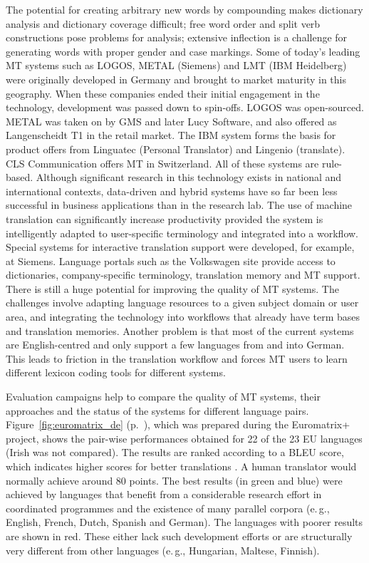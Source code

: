 \documentclass[]{../../metanetpaper}
\begin{document}
\begin{multicols}{2}
The potential for creating arbitrary new words by compounding makes dictionary analysis and dictionary coverage difficult; free word order and split verb constructions pose problems for analysis; extensive inflection is a challenge for generating words with proper gender and case markings. Some of today's leading MT systems such as LOGOS, METAL (Siemens) and LMT (IBM Heidelberg) were originally developed in Germany and brought to market maturity in this geography. When these companies ended their initial engagement in the technology, development was passed down to spin-offs. LOGOS was open-sourced. METAL was taken on by GMS and later Lucy Software, and also offered as Langenscheidt T1 in the retail market. The IBM system forms the basis for product offers from Linguatec (Personal Translator) and Lingenio (translate). CLS Communication offers MT in Switzerland. All of these systems are rule-based. Although significant research in this technology exists in national and international contexts, data-driven and hybrid systems have so far been less successful in business applications than in the research lab. The use of machine translation can significantly increase productivity provided the system is intelligently adapted to user-specific terminology and integrated into a workflow. Special systems for interactive translation support were developed, for example, at Siemens. Language portals such as the Volkswagen site provide access to dictionaries, company-specific terminology, translation memory and MT support. There is still a huge potential for improving the quality of MT systems. The challenges involve adapting language resources to a given subject domain or user area, and integrating the technology into workflows that already have term bases and translation memories. Another problem is that most of the current systems are English-centred and only support a few languages from and into German. This leads to friction in the translation workflow and forces MT users to learn different lexicon coding tools for different systems.

Evaluation campaigns help to compare the quality of MT systems, their approaches and the status of the systems for different language pairs. Figure~\ref{fig:euromatrix_de} (p.~\pageref{fig:euromatrix_de}), which was prepared during the Euromatrix+ project, shows the pair-wise performances obtained for 22 of the 23 EU languages (Irish was not compared). The results are ranked according to a BLEU score, which indicates higher scores for better translations \cite{bleu1}. A human translator would normally achieve around 80 points. The best results (in green and blue) were achieved by languages that benefit from a considerable research effort in coordinated programmes and the existence of many parallel corpora (e.\,g., English, French, Dutch, Spanish and German). The languages with poorer results are shown in red. These either lack such development efforts or are structurally very different from other languages (e.\,g., Hungarian, Maltese, Finnish).


\end{multicols}
\end{document}

